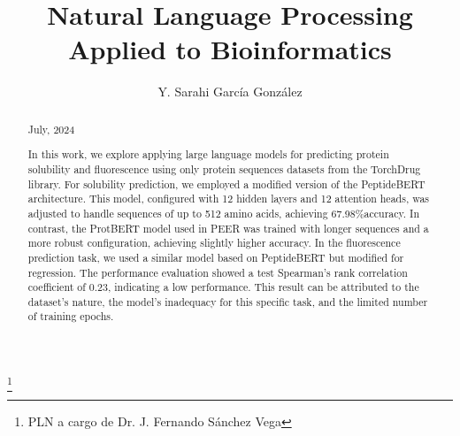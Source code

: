 \documentclass[letterpaper,spanish,reprint,nofootinbib,showkeys,aps]{revtex4-2}
\begin{document}
\title{\Large{\textbf{Natural Language Processing Applied to Bioinformatics}}}
\author{Y. Sarahi García González}
\thanks{PLN a  cargo de Dr. J. Fernando Sánchez Vega}



\begin{abstract}
\begin{center}
\small{July, 2024}
\end{center}
\vspace{0.6cm}


In this work, we explore applying large language models for predicting protein solubility and fluorescence using only protein sequences datasets from the TorchDrug library. 
For solubility prediction, we employed a modified version of the PeptideBERT architecture. This model, configured with 12 hidden layers and 12 attention heads, was adjusted to handle sequences of up to 512 amino acids, achieving 67.98$\% $accuracy. In contrast, the ProtBERT model used in PEER was trained with longer sequences and a more robust configuration, achieving slightly higher accuracy.
In the fluorescence prediction task, we used a similar model based on PeptideBERT but modified for regression. The performance evaluation showed a test Spearman's rank correlation coefficient of 0.23, indicating a low performance. This result can be attributed to the dataset's nature, the model's inadequacy for this specific task, and the limited number of training epochs.

\end{abstract}

\maketitle

\end{document}
